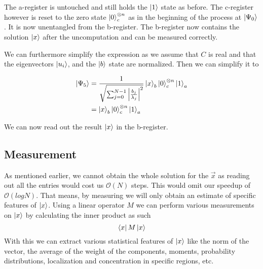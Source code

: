 The a-register is untouched and still holds the $\ket 1$ state as before. 
The c-register however is reset to the zero state $\ket{0}^{\otimes n}_c$ as in the beginning of the process at $\ket {\Psi_0}$. 
It is now unentangled from the b-register.
The b-register now contains the solution $\ket x$ after the uncomputation and can be measured correctly.

We can furthermore simplify the expression as we assume that  $C$ is real and that the eigenvectors $\ket{u_i}$, and the $\ket b$ state are normalized.
Then we can simplify it to

\begin{equation}
\begin{split}
\ket{\Psi_5} &= \frac {1} {\sqrt{\sum_{j=0}^{N-1} \left| \frac{b_j} {\lambda_j}\right|^2}}
\ket{x}_b \ket{0}^{\otimes n}_c \ket{1}_a\\
&= \ket{x}_b \ket{0}^{\otimes n}_c \ket{1}_a
\end{split}
\end{equation}

We can now read out the result $\ket x$ in the b-register.

\subsection{Measurement}
As mentioned earlier, we cannot obtain the whole solution for the $\vec x$ as reading out all the entries would cost us $\mathcal{O}(N)$ steps.
This would omit our speedup of $\mathcal{O}(log N)$. 
That means, by measuring we will only obtain an estimate of specific features of $\ket x$.
Using a linear operator $M$ we can perform various measurements on $\ket x$ by calculating the inner product as such
\begin{equation}
    \bra x M \ket x
\end{equation}
With this we can extract various statistical features of $\ket x$ like the norm of the vector, the average of the weight of the components, moments, probability distributions, localization and concentration in specific regions, etc.


























